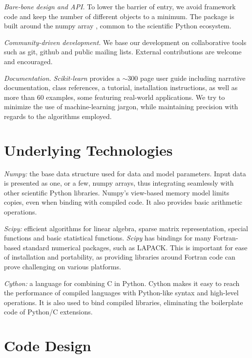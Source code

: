 \documentclass[twoside,11pt]{article}
\begin{document}
\noindent\emph{Bare-bone design and API.}
%
To lower the barrier of entry, we avoid framework code and keep the number
of different objects to a minimum.
The package is built
around the numpy array \citep{Vanderwalt2011}, common to the
scientific Python ecosystem.

\noindent\emph{Community-driven development.}
%
We base our development on collaborative tools such as git, github and
public mailing lists. External contributions are welcome and
encouraged.%

\noindent\emph{Documentation.}
%
\emph{Scikit-learn} provides a $\sim$300 page user guide including
narrative documentation, class references, a tutorial, installation
instructions, as well as more than 60 examples, some featuring
real-world applications. We try to minimize the use of
machine-learning jargon, while maintaining precision with
regards to the algorithms employed.


\section{Underlying Technologies}

\noindent\emph{Numpy:}
%
the base data structure used for data and model parameters.
Input data is
presented as one, or a few, numpy arrays, thus integrating seamlessly
with other scientific Python libraries. Numpy's view-based memory
model limits copies, even when binding with compiled code. It also
provides basic arithmetic operations.

\noindent\emph{Scipy:}
%
efficient algorithms for linear algebra, sparse matrix representation,
special functions and basic statistical functions. {\sl Scipy} has
bindings for many Fortran-based standard numerical packages, such as
LAPACK. This is important for ease of installation and portability, as
providing libraries around Fortran code can prove challenging on
various platforms.

\noindent\emph{Cython:}
%
a language for combining C in Python. Cython makes it easy to
reach the performance of compiled languages with
Python-like syntax and high-level operations. It is also used to
bind compiled libraries, eliminating the boilerplate code
of Python/C extensions.

\section{Code Design}
\end{document}
